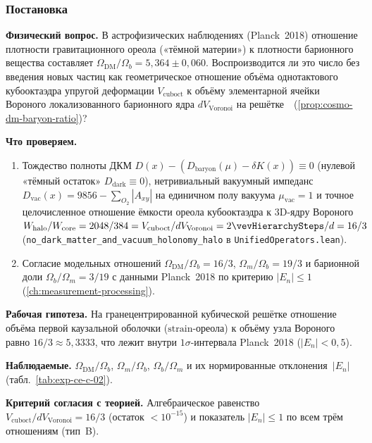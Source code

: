\label{exp:cec02}

\subsubsection*{Постановка}
\textbf{Физический вопрос.}
В астрофизических наблюдениях (Planck~2018) отношение плотности гравитационного ореола («тёмной материи») к плотности барионного вещества составляет $\Omega_{\mathrm{DM}}/\Omega_b = 5{,}364 \pm 0{,}060$.
Воспроизводится ли это число без введения новых частиц как геометрическое отношение объёма однотактового кубооктаэдра упругой деформации $V_{\mathrm{cuboct}}$ к объёму элементарной ячейки Вороного локализованного барионного ядра $dV_{\mathrm{Voronoi}}$ на решётке~\latGCKshort\ (\cref{prop:cosmo-dm-baryon-ratio})?

\textbf{Что проверяем.}
\begin{enumerate}[label=\textbf{(\alph*)},leftmargin=*,itemsep=0.25em]
\item Тождество полноты ДКМ $D(x) - (D_{\mathrm{baryon}}(\mu) - \delta K(x)) \equiv 0$ (нулевой «тёмный остаток» $D_{\mathrm{dark}}\equiv 0$), нетривиальный вакуумный импеданс $D_{\mathrm{vac}}(x) = 9856 - \sum_{O_2}|A_{xy}|$ на единичном полу вакуума $\mu_{\mathrm{vac}}=1$ и точное целочисленное отношение ёмкости ореола кубооктаэдра к $3\mathrm{D}$-ядру Вороного $W_{\mathrm{halo}}/W_{\mathrm{core}} = 2048/384 = V_{\mathrm{cuboct}}/dV_{\mathrm{Voronoi}} = 2\vevHierarchySteps/d = 16/3$ (\texttt{no\_\allowbreak dark\_\allowbreak matter\_\allowbreak and\_\allowbreak vacuum\_\allowbreak holonomy\_\allowbreak halo} в \texttt{UnifiedOperators.lean}).
\item Согласие модельных отношений $\Omega_{\mathrm{DM}}/\Omega_b = 16/3$, $\Omega_m/\Omega_b = 19/3$ и барионной доли $\Omega_b/\Omega_m = 3/19$ с данными Planck~2018 по критерию $|E_n| \le 1$ (\cref{ch:measurement-processing}).
\end{enumerate}

\textbf{Рабочая гипотеза.}
На гранецентрированной кубической решётке отношение объёма первой каузальной оболочки ($\mathrm{strain}$-ореола) к объёму узла Вороного равно $16/3 \approx 5{,}3333$, что лежит внутри $1\sigma$-интервала Planck~2018 ($|E_n| < 0{,}5$).

\textbf{Наблюдаемые.}
$\Omega_{\mathrm{DM}}/\Omega_b$, $\Omega_m/\Omega_b$, $\Omega_b/\Omega_m$ и их нормированные отклонения~$|E_n|$ (табл.~\ref{tab:exp-ce-c-02}).

\textbf{Критерий согласия с теорией.}
Алгебраическое равенство $V_{\mathrm{cuboct}}/dV_{\mathrm{Voronoi}} = 16/3$ (остаток $<10^{-15}$) и показатель $|E_n| \le 1$ по всем трём отношениям (тип~B).


